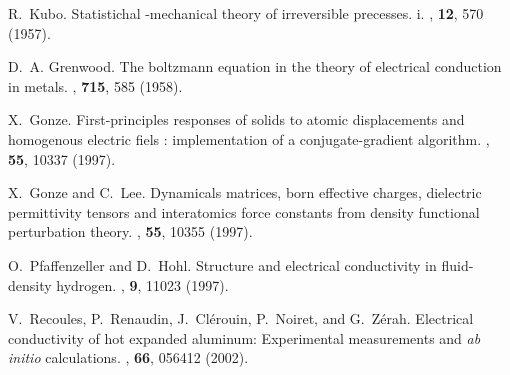 \documentclass[a4,12pts]{article}
\begin{document}
\begin{thebibliography}{1}

R.~Kubo.
\newblock Statistichal -mechanical theory of irreversible precesses. i.
, \textbf{12}, 570 (1957).

D.~A. Grenwood.
\newblock The boltzmann equation in the theory of electrical conduction in
  metals.
, \textbf{715}, 585 (1958).

X.~Gonze.
\newblock First-principles responses of solids to atomic displacements and
  homogenous electric fiels : implementation of a conjugate-gradient algorithm.
, \textbf{55}, 10337 (1997).

X.~Gonze and C.~Lee.
\newblock Dynamicals matrices, born effective charges, dielectric permittivity
  tensors and interatomics force constants from density functional perturbation
  theory.
, \textbf{55}, 10355 (1997).

O.~Pfaffenzeller and D.~Hohl.
\newblock Structure and electrical conductivity in fluid-density hydrogen.
, \textbf{9}, 11023 (1997).

V.~Recoules, P.~Renaudin, J.~Cl{\'e}rouin, P.~Noiret, and G.~Z{\'e}rah.
\newblock Electrical conductivity of hot expanded aluminum: Experimental
  measurements and {\it ab initio} calculations.
, \textbf{66}, 056412 (2002).

\end{thebibliography}
\end{document}
